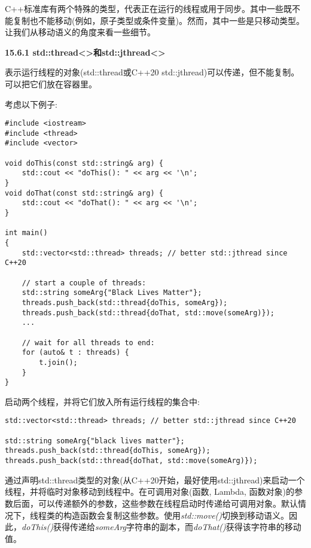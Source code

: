 C++标准库有两个特殊的类型，代表正在运行的线程或用于同步。其中一些既不能复制也不能移动(例如，原子类型或条件变量)。然而，其中一些是只移动类型。让我们从移动语义的角度来看一些细节。\par

\hspace*{\fill} \par %
\textbf{15.6.1 std::thread<>和std::jthread<>}

表示运行线程的对象(std::thread或C++20 std::jthread)可以传递，但不能复制。可以把它们放在容器里。\par

考虑以下例子:\par

{\color{red}{lib/thread.cpp}}\par

\begin{lstlisting}[caption={}]
#include <iostream>
#include <thread>
#include <vector>

void doThis(const std::string& arg) {
	std::cout << "doThis(): " << arg << '\n';
}
void doThat(const std::string& arg) {
	std::cout << "doThat(): " << arg << '\n';
}

int main()
{
	std::vector<std::thread> threads; // better std::jthread since C++20
	
	// start a couple of threads:
	std::string someArg{"Black Lives Matter"};
	threads.push_back(std::thread{doThis, someArg});
	threads.push_back(std::thread{doThat, std::move(someArg)});
	...
	
	// wait for all threads to end:
	for (auto& t : threads) {
		t.join();
	}
}
\end{lstlisting}

启动两个线程，并将它们放入所有运行线程的集合中:\par

\begin{lstlisting}[caption={}]
std::vector<std::thread> threads; // better std::jthread since C++20

std::string someArg{"black lives matter"};
threads.push_back(std::thread{doThis, someArg});
threads.push_back(std::thread{doThat, std::move(someArg)});
\end{lstlisting}

通过声明std::thread类型的对象(从C++20开始，最好使用std::jthread)来启动一个线程，并将临时对象移动到线程中。在可调用对象(函数, Lambda, 函数对象)的参数后面，可以传递额外的参数，这些参数在线程启动时传递给可调用对象。默认情况下，线程类的构造函数会复制这些参数。使用\textit{std::move()}切换到移动语义。因此，\textit{doThis()}获得传递给\textit{someArg}字符串的副本，而\textit{doThat()}获得该字符串的移动值。\par

